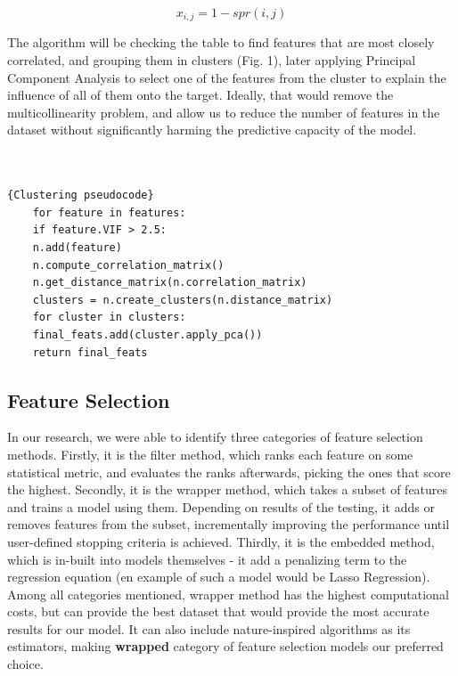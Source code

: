 \documentclass[conference]{IEEEtran}
\begin{document}
\begin{equation}
	x_{i, j}=1-spr(i, j)
\end{equation}

The algorithm will be checking the table to find features that are most closely correlated, and grouping them in clusters (Fig. 1), later applying Principal Component Analysis to select one of the features from the cluster to explain the influence of all of them onto the target. Ideally, that would remove the multicollinearity problem, and allow us to reduce the number of features in the dataset without significantly harming the predictive capacity of the model. \\ \\ \\

\begin{lstlisting}[]{Clustering pseudocode}
	for feature in features:
	if feature.VIF > 2.5:
	n.add(feature)
	n.compute_correlation_matrix()
	n.get_distance_matrix(n.correlation_matrix)
	clusters = n.create_clusters(n.distance_matrix)
	for cluster in clusters:
	final_feats.add(cluster.apply_pca())
	return final_feats
\end{lstlisting}

\subsection{Feature Selection}

In our research, we were able to identify three categories of feature selection methods. Firstly, it is the filter method, which ranks each feature on some statistical metric, and evaluates the ranks afterwards, picking the ones that score the highest. Secondly, it is the wrapper method, which takes a subset of features and trains a model using them. Depending on results of the testing, it adds or removes features from the subset, incrementally improving the performance until user-defined stopping criteria is achieved. Thirdly, it is the embedded method, which is in-built into models themselves - it add a penalizing term to the regression equation (en example of such a model would be Lasso Regression)\cite{twdMLfeatsec}.\\

Among all categories mentioned, wrapper method has the highest computational costs, but can provide the best dataset that would provide the most accurate results for our model. It can also include nature-inspired algorithms as its estimators, making \textbf{wrapped} category of feature selection models our preferred choice.\\
\end{document}
